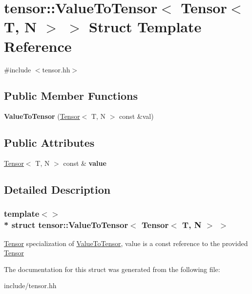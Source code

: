 \hypertarget{structtensor_1_1ValueToTensor_3_01Tensor_3_01T_00_01N_01_4_01_4}{}\section{tensor\+:\+:Value\+To\+Tensor$<$ Tensor$<$ T, N $>$ $>$ Struct Template Reference}
\label{structtensor_1_1ValueToTensor_3_01Tensor_3_01T_00_01N_01_4_01_4}


{\ttfamily \#include $<$tensor.\+hh$>$}

\subsection*{Public Member Functions}
\begin{DoxyCompactItemize}
\item 
{\bfseries Value\+To\+Tensor} (\hyperlink{classtensor_1_1Tensor}{Tensor}$<$ T, N $>$ const \&val)\hypertarget{structtensor_1_1ValueToTensor_3_01Tensor_3_01T_00_01N_01_4_01_4_a153a997dbc0ecc3f6f48457438cce283}{}\label{structtensor_1_1ValueToTensor_3_01Tensor_3_01T_00_01N_01_4_01_4_a153a997dbc0ecc3f6f48457438cce283}

\end{DoxyCompactItemize}
\subsection*{Public Attributes}
\begin{DoxyCompactItemize}
\item 
\hyperlink{classtensor_1_1Tensor}{Tensor}$<$ T, N $>$ const \& {\bfseries value}\hypertarget{structtensor_1_1ValueToTensor_3_01Tensor_3_01T_00_01N_01_4_01_4_ab2f19b40156d94f719ff95270f7c8307}{}\label{structtensor_1_1ValueToTensor_3_01Tensor_3_01T_00_01N_01_4_01_4_ab2f19b40156d94f719ff95270f7c8307}

\end{DoxyCompactItemize}


\subsection{Detailed Description}
\subsubsection*{template$<$$>$\\*
struct tensor\+::\+Value\+To\+Tensor$<$ Tensor$<$ T, N $>$ $>$}

\hyperlink{classtensor_1_1Tensor}{Tensor} specialization of \hyperlink{structtensor_1_1ValueToTensor}{Value\+To\+Tensor}, {\ttfamily value} is a const reference to the provided \hyperlink{classtensor_1_1Tensor}{Tensor} 

The documentation for this struct was generated from the following file\+:\begin{DoxyCompactItemize}
\item 
include/tensor.\+hh\end{DoxyCompactItemize}
